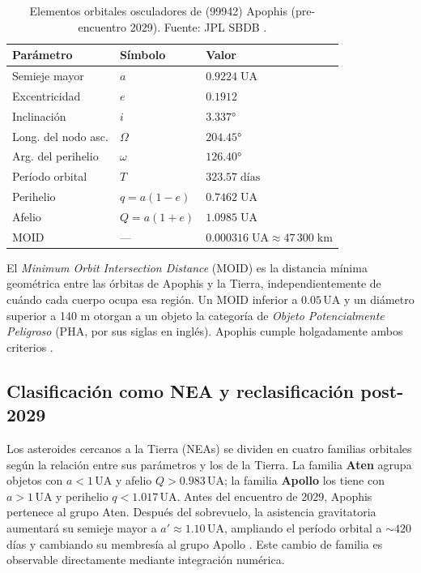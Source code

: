 \documentclass[a4paper]{article}
\begin{document}
\begin{table}[H]
  \centering
  \caption{Elementos orbitales osculadores de (99942) Apophis (pre-encuentro 2029). Fuente: JPL SBDB \cite{jpl2024sbdb, farnocchia2023orbit}.}
  \label{tab:elementos}
  \begin{tabular}{lll}
    \toprule
    \textbf{Parámetro} & \textbf{Símbolo} & \textbf{Valor} \\
    \midrule
    Semieje mayor        & $a$    & $0.9224 \;\text{UA}$ \\
    Excentricidad        & $e$    & $0.1912$ \\
    Inclinación          & $i$    & $3.337°$ \\
    Long. del nodo asc.  & $\Omega$ & $204.45°$ \\
    Arg. del perihelio   & $\omega$ & $126.40°$ \\
    Período orbital      & $T$    & $323.57 \;\text{días}$ \\
    Perihelio            & $q = a(1-e)$ & $0.7462 \;\text{UA}$ \\
    Afelio               & $Q = a(1+e)$ & $1.0985 \;\text{UA}$ \\
    MOID                 & ---    & $0.000316 \;\text{UA} \approx 47\,300 \;\text{km}$ \\
    \bottomrule
  \end{tabular}
\end{table}

El \textit{Minimum Orbit Intersection Distance} (MOID) es la distancia mínima geométrica entre las órbitas de Apophis y la Tierra, independientemente de cuándo cada cuerpo ocupa esa región. Un MOID inferior a $0.05\,\text{UA}$ y un diámetro superior a 140 m otorgan a un objeto la categoría de \textit{Objeto Potencialmente Peligroso} (PHA, por sus siglas en inglés). Apophis cumple holgadamente ambos criterios \cite{jpl2024sbdb}.

\subsection{Clasificación como NEA y reclasificación post-2029}

Los asteroides cercanos a la Tierra (NEAs) se dividen en cuatro familias orbitales según la relación entre sus parámetros y los de la Tierra. La familia \textbf{Aten} agrupa objetos con $a < 1\,\text{UA}$ y afelio $Q > 0.983\,\text{UA}$; la familia \textbf{Apollo} los tiene con $a > 1\,\text{UA}$ y perihelio $q < 1.017\,\text{UA}$. Antes del encuentro de 2029, Apophis pertenece al grupo Aten. Después del sobrevuelo, la asistencia gravitatoria aumentará su semieje mayor a $a' \approx 1.10\,\text{UA}$, ampliando el período orbital a $\sim 420$ días y cambiando su membresía al grupo Apollo \cite{esa2024apophis, jpl2024sbdb}. Este cambio de familia es observable directamente mediante integración numérica.
\end{document}
